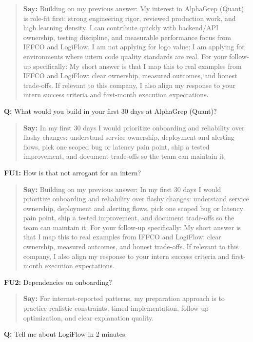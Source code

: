 \documentclass[9pt,a4paper]{article}
\begin{document}
\begin{quote}\small\textbf{Say:} Building on my previous answer: My interest in AlphaGrep (Quant) is role-fit first: strong engineering rigor, reviewed production work, and high learning density. I can contribute quickly with backend/API ownership, testing discipline, and measurable performance focus from IFFCO and LogiFlow. I am not applying for logo value; I am applying for environments where intern code quality standards are real. For your follow-up specifically: My short answer is that I map this to real examples from IFFCO and LogiFlow: clear ownership, measured outcomes, and honest trade-offs. If relevant to this company, I also align my response to your intern success criteria and first-month execution expectations.\end{quote}
\vspace{2mm}
\textbf{Q:} What would you build in your first 30 days at AlphaGrep (Quant)?

\begin{quote}\small\textbf{Say:} In my first 30 days I would prioritize onboarding and reliability over flashy changes: understand service ownership, deployment and alerting flows, pick one scoped bug or latency pain point, ship a tested improvement, and document trade-offs so the team can maintain it.\end{quote}
\vspace{2mm}
\textbf{FU1:} How is that not arrogant for an intern?

\begin{quote}\small\textbf{Say:} Building on my previous answer: In my first 30 days I would prioritize onboarding and reliability over flashy changes: understand service ownership, deployment and alerting flows, pick one scoped bug or latency pain point, ship a tested improvement, and document trade-offs so the team can maintain it. For your follow-up specifically: My short answer is that I map this to real examples from IFFCO and LogiFlow: clear ownership, measured outcomes, and honest trade-offs. If relevant to this company, I also align my response to your intern success criteria and first-month execution expectations.\end{quote}
\vspace{2mm}
\textbf{FU2:} Dependencies on onboarding?

\begin{quote}\small\textbf{Say:} For internet-reported patterns, my preparation approach is to practice realistic constraints: timed implementation, follow-up optimization, and clear explanation quality.\end{quote}
\vspace{2mm}
\textbf{Q:} Tell me about LogiFlow in 2 minutes.
\end{document}
